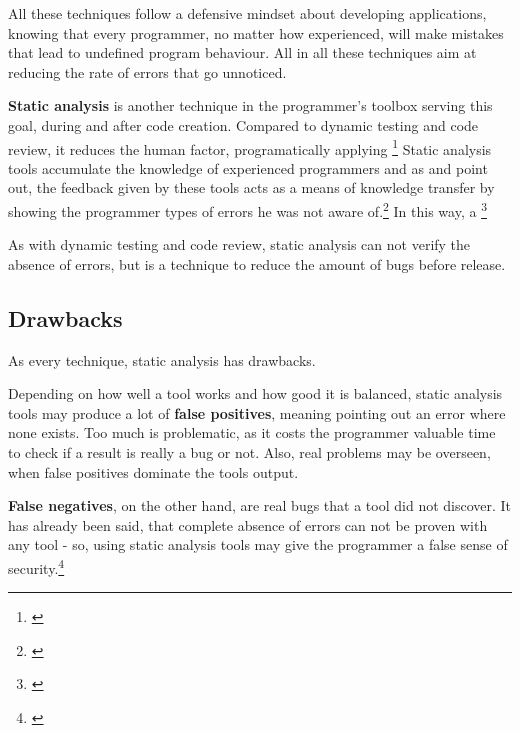All these techniques follow a defensive mindset about developing applications, knowing that every programmer, no matter how experienced, will make mistakes that lead to undefined program behaviour. All in all these techniques aim at reducing the rate of errors that go unnoticed.

\textbf{Static analysis} is another technique in the programmer's toolbox serving this goal, during and after code creation. Compared to dynamic testing and code review, it reduces the human factor, programatically applying \footnote{\citep[22]{SecureProgramming}} Static analysis tools accumulate the knowledge of experienced programmers and as  and  point out, the feedback given by these tools acts as a means of knowledge transfer by showing the programmer types of errors he was not aware of.\footnote{\citep[22]{SecureProgramming}} In this way, a \footnote{\citep[13]{SecureProgramming}}

As with dynamic testing and code review, static analysis can not verify the absence of errors, but is a technique to reduce the amount of bugs before release.

\subsection{Drawbacks}

As every technique, static analysis has drawbacks. 

Depending on how well a tool works and how good it is balanced, static analysis tools may produce a lot of \textbf{false positives}, meaning pointing out an error where none exists. Too much  is problematic, as it costs the programmer valuable time to check if a result is really a bug or not. Also, real problems may be overseen, when false positives dominate the tools output.

\textbf{False negatives}, on the other hand, are real bugs that a tool did not discover. It has already been said, that complete absence of errors can not be proven with any tool - so, using static analysis tools may give the programmer a false sense of security.\footnote{\citep[23]{SecureProgramming}}


